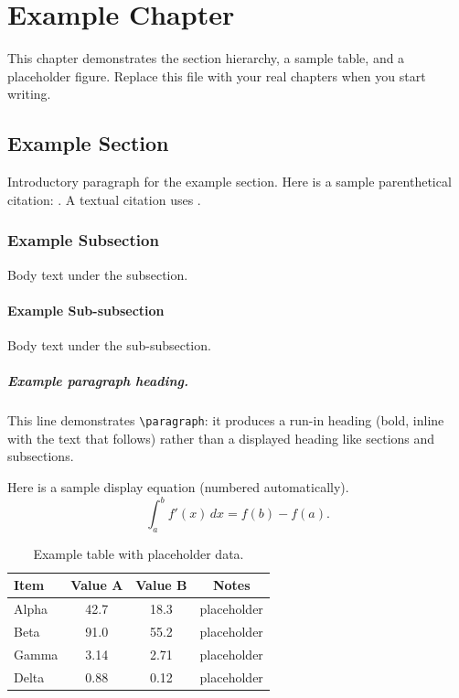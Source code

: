 \chapter{Example Chapter}

This chapter demonstrates the section hierarchy, a sample table, and a placeholder
figure. Replace this file with your real chapters when you start writing.

\section{Example Section}

Introductory paragraph for the example section. Here is a sample parenthetical
citation: \citep{knuth1984literate}. A textual citation uses
\citet{knuth1984literate}.

\subsection{Example Subsection}

Body text under the subsection.

\subsubsection{Example Sub-subsection}
 
Body text under the sub-subsection.

\paragraph{Example paragraph heading.}
This line demonstrates \verb|\paragraph|: it produces a run-in heading (bold,
inline with the text that follows) rather than a displayed heading like sections
and subsections.

Here is a sample display equation (numbered automatically).
\begin{equation}
  \label{eq:example}
  \int_{a}^{b} f'(x)\,dx = f(b) - f(a).
\end{equation}

\begin{table}[ht]
  \centering
  \begin{tabular}{lccc}
    \toprule
    Item & Value A & Value B & Notes \\
    \midrule
    Alpha & 42.7 & 18.3 & placeholder \\
    Beta & 91.0 & 55.2 & placeholder \\
    Gamma & 3.14 & 2.71 & placeholder \\
    Delta & 0.88 & 0.12 & placeholder \\
    \bottomrule
  \end{tabular}
  \caption{Example table with placeholder data.}
  \label{tab:example-placeholder}
\end{table}

